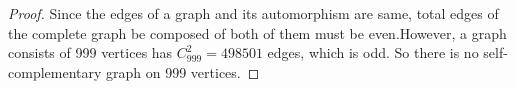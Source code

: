 

\begin{proof}
Since the edges of a graph and its automorphism are same, total edges of the complete graph be composed of both of them must be even.However, a graph consists of 999 vertices has $C_{999}^2=498501$ edges, which is odd. So there is no self-complementary graph on 999 vertices.
\end{proof}

